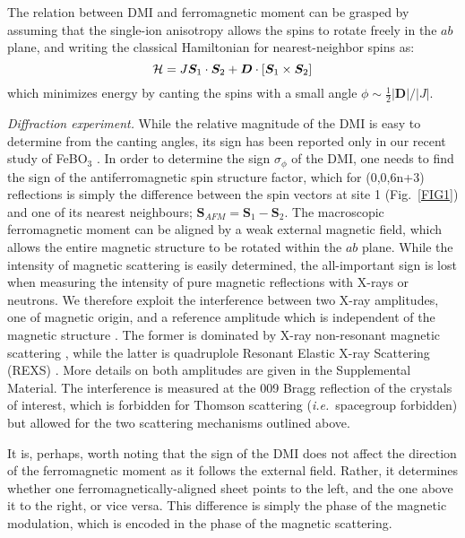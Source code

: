\documentclass[aps,prl,showpacs,reprint,floatfix]{revtex4-1}
\begin{document}
The relation between DMI and ferromagnetic moment can be grasped by assuming that the single-ion anisotropy allows the spins to rotate freely in the $ab$ plane, and writing the classical Hamiltonian for nearest-neighbor spins as:
\begin{equation}
 {\cal H}=J\bm{S}_1 \cdot \bm{S}_2+\bm{D} \cdot \left[ \bm{S}_1 \times \bm{S}_2 \right]
 \label{Hamiltonian}
\end{equation}
which minimizes energy by canting the spins with a small angle $\phi\sim \frac{1}{2}|\bm{D}|/|J|$.

{\it Diffraction experiment.} 
While the relative magnitude of the DMI is easy to determine from the canting angles, 
its sign has been reported only in our recent study of FeBO$_3$ \cite{DmitrienkoNP}.
In order to determine the sign $\sigma_\phi$ of the DMI, one needs to find the sign of the antiferromagnetic spin structure factor, which for (0,0,6n+3) reflections is simply the 
difference between the spin vectors at site 1 (Fig.~\ref{FIG1}) and one of its nearest neighbours; 
$\bm{S}_{AFM}=\bm{S}_1-\bm{S}_2$.
The macroscopic ferromagnetic moment can be aligned by a weak external magnetic field, which allows the entire magnetic structure to be rotated within the $ab$ plane.
While the intensity of magnetic scattering is easily determined, the all-important sign is 
lost when measuring the intensity of pure magnetic reflections with X-rays or neutrons.
We therefore exploit the interference between two X-ray amplitudes, one of magnetic origin, and a reference amplitude which is independent of the magnetic structure \cite{DmitrienkoNP}.
The former is dominated by X-ray non-resonant magnetic scattering \cite{deBergevin}, while the latter is quadruplole Resonant Elastic X-ray Scattering (REXS) \cite{GrenierREXS}. 
More details on both amplitudes are given in the Supplemental Material.
The interference is measured at the 009 Bragg reflection of the crystals of interest, which is forbidden for Thomson scattering (\textit{i.e.}~spacegroup forbidden) 
but allowed for the two scattering mechanisms outlined above.

It is, perhaps, worth noting that the sign of the DMI does not affect the direction of the ferromagnetic moment as it follows the external field. Rather, it 
determines whether one ferromagnetically-aligned sheet points to the left, and the one above it to the right, or vice versa. This difference is simply the phase of
the magnetic modulation, which is encoded in the phase of the magnetic scattering.
\end{document}

